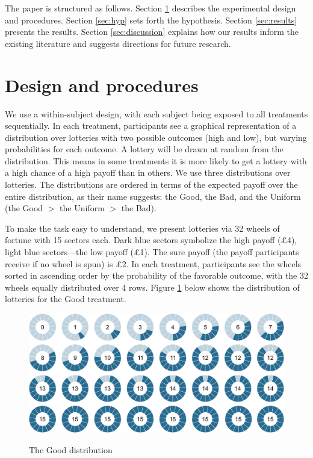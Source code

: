 The paper is structured as follows.
Section \ref{sec:proced} describes the experimental design and procedures.
Section \ref{sec:hyp} sets forth the hypothesis.
Section \ref{sec:results} presents the results.
Section \ref{sec:discussion} explains how our results inform the existing literature and suggests directions for future research.


\section{Design and procedures}\label{sec:proced}
We use a within-subject design, with each subject being exposed to all treatments sequentially.
In each treatment, participants see a graphical representation of a distribution over lotteries with two possible outcomes (high and low), but varying probabilities for each outcome.
A lottery will be drawn at random from the distribution.
This means in some treatments it is more likely to get a lottery with a high chance of a high payoff than in others.
We use three distributions over lotteries.
The distributions are ordered in terms of the expected payoff over the entire distribution, as their name suggests: the Good, the Bad, and the Uniform (the Good $>$ the Uniform $>$ the Bad).

To make the task easy to understand, we present lotteries via 32 wheels of fortune with 15 sectors each.
Dark blue sectors symbolize the high payoff (\pounds4), light blue sectors---the low payoff (\pounds1).
The sure payoff (the payoff participants receive if no wheel is spun) is \pounds2.
In each treatment, participants see the wheels sorted in ascending order by the probability of the favorable outcome, with the 32 wheels equally distributed over 4 rows.
Figure \ref{fig:TheGood} below shows the distribution of lotteries for the Good treatment.

\begin{figure}[h!]
  \centering
 {\includegraphics[width=\linewidth]{Left_15.pdf}}
  \caption{The Good distribution}
  \label{fig:TheGood}
\end{figure}

